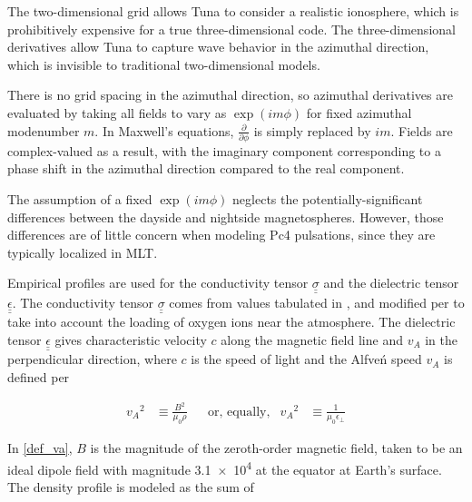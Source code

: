 \documentclass[draft,linenumbers]{agujournal}
\begin{document}
The two-dimensional grid allows Tuna to consider a realistic ionosphere, which is prohibitively expensive for a true three-dimensional code. The three-dimensional derivatives allow Tuna to capture wave behavior in the azimuthal direction, which is invisible to traditional two-dimensional models.

There is no grid spacing in the azimuthal direction, so azimuthal derivatives are evaluated by taking all fields to vary as $\exp \left(i m \phi\right)$ for fixed azimuthal modenumber $m$. In Maxwell's equations, $\frac{\partial}{\partial \phi}$ is simply replaced by $i m$. Fields are complex-valued as a result, with the imaginary component corresponding to a phase shift in the azimuthal direction compared to the real component.

The assumption of a fixed $\exp \left(i m \phi\right)$ neglects the potentially-significant differences between the dayside and nightside magnetospheres. However, those differences are of little concern when modeling Pc4 pulsations, since they are typically localized in MLT\citep{anderson_1990,dai_2015,engebretson_1992,liu_2009}.


Empirical profiles are used for the conductivity tensor $\underline{\underline{\sigma}}$ and the dielectric tensor $\underline{\underline{\epsilon}}$. The conductivity tensor $\underline{\underline{\sigma}}$ comes from values tabulated in \citet{kelley_1989}, and modified per \citet{lysak_2013} to take into account the loading of oxygen ions near the atmosphere. The dielectric tensor $\underline{\underline{\epsilon}}$ gives characteristic velocity $c$ along the magnetic field line and $v_A$ in the perpendicular direction, where $c$ is the speed of light and the Alfve\'n speed $v_A$ is defined per

\begin{linenomath*}
\begin{align}
    \label{def_va}
    {v_A}^2 &\equiv \frac{B^2}{\mu_0\rho} &
    & \text{or, equally,} &
    {v_A}^2 &\equiv \frac{1}{\mu_0\epsilon_\bot}
\end{align}
\end{linenomath*}

In \cref{def_va}, $B$ is the magnitude of the zeroth-order magnetic field, taken to be an ideal dipole field with magnitude \SI{3.1e4}{\nT} at the equator at Earth's surface. The density profile is modeled as the sum of
\end{document}
